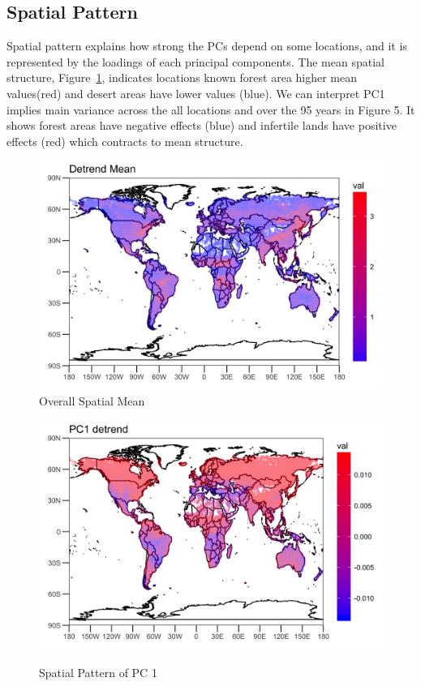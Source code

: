 \documentclass[11pt]{article}
\begin{document}
\subsection{Spatial Pattern}
Spatial pattern explains how strong the PCs depend on some locations, and it is represented by the loadings of each principal components. The mean spatial structure, Figure~\ref{fig:scalepcade}, indicates locations known forest area higher mean values(red) and desert areas have lower values (blue).  We can interpret PC1 implies main variance across the all locations and over the 95 years in Figure 5. It shows forest areas have negative effects (blue) and infertile lands have positive effects (red) which contracts to mean structure. 
\begin{figure}
	\centering
	\includegraphics[width=0.7\linewidth]{../img/Scale_PCA_de}
	\caption{Overall Spatial Mean}
	\label{fig:scalepcade}
\end{figure}

\begin{figure}
	\centering
	{\includegraphics[width=0.7\linewidth]{../img/loading_PC1_de}}
	\label{fig:pc1-spatial}
	\caption{Spatial Pattern of PC 1}
\end{figure}
\end{document}
